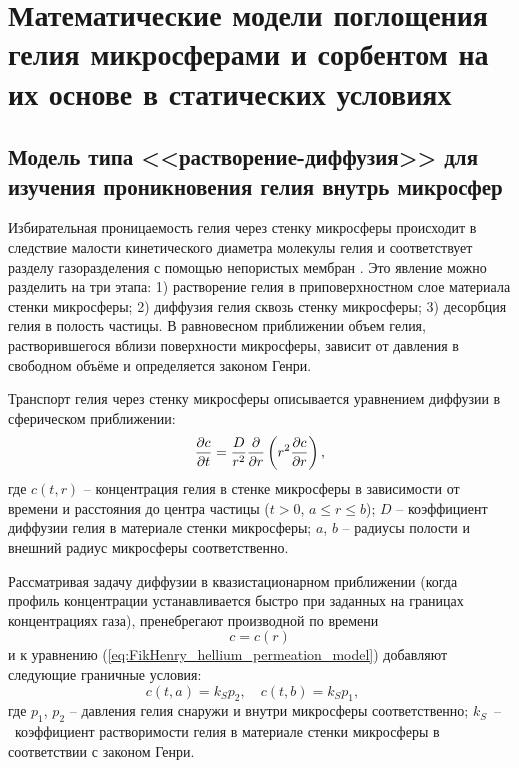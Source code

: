 \chapter{Математические модели поглощения гелия микросферами и сорбентом на их основе в статических условиях}
 \label{section_2}
 
\section{Модель типа <<растворение-диффузия>> для изучения проникновения гелия внутрь микросфер}
 \label{section_2_1}
 
Избирательная проницаемость гелия через стенку микросферы происходит в следствие малости кинетического диаметра молекулы гелия и соответствует разделу газоразделения с помощью непористых мембран \cite{Mulder}. Это явление можно разделить на три этапа: 1) растворение гелия в приповерхностном слое материала стенки микросферы; 2) диффузия гелия сквозь стенку микросферы; 3) десорбция гелия в полость частицы. В равновесном приближении объем гелия, растворившегося вблизи поверхности микросферы, зависит от давления в свободном объёме и определяется законом Генри. 

Транспорт гелия через стенку микросферы описывается уравнением диффузии в сферическом приближении:
\begin{equation}
\label{eq:FikHenry_hellium_permeation_model}
\frac{\partial c}{\partial t}=\frac{D}{r^2}\frac{\partial }{\partial r}\left( r^2 \frac{\partial c}{\partial r} \right),
\end{equation}
где $c(t,r)$ -- концентрация гелия в стенке микросферы в зависимости от времени и расстояния до центра частицы ($t > 0$, $a \leq r \leq b$); $D$ -- коэффициент диффузии гелия в материале стенки микросферы; $a$, $b$ -- радиусы полости и внешний радиус микросферы соответственно. 

Рассматривая задачу диффузии в квазистационарном приближении (когда профиль концентрации устанавливается быстро при заданных на границах концентрациях газа), пренебрегают производной по времени 
\begin{equation}
\label{eq:FikHenry_hellium_permeation_model_quasistat}
c = c(r)
\end{equation}
и к уравнению (\ref{eq:FikHenry_hellium_permeation_model}) добавляют следующие граничные условия:
\begin{equation}
\label{eq:FikHenry_hellium_permeation_model_conditions}
c(t, a)  = k_S p_2,\quad
c(t, b)  = k_S p_1,\quad
\end{equation}
где $p_1$, $p_2$ -- давления гелия снаружи и внутри микросферы соответственно; $k_S$~--~коэффициент растворимости гелия в материале стенки микросферы в соответствии с законом Генри.

